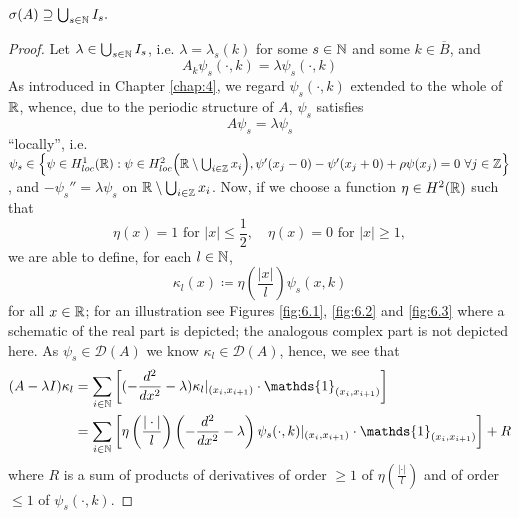 \begin{theorem} \label{4.1:thm-MainResult.FirstInclusion}
	$\sigma(A) \supseteq \bigcup_{s \in \mathbb{N}} I_{s}.$
	
	\begin{proof}
		Let $\lambda \in \bigcup_{s \in \mathbb{N}} I_{s}$, i.e. $\lambda = \lambda_{s}(k)$ for some $s \in \mathbb{N}$ and some $k \in \overline{B}$, and 
		\begin{equation}
			A_{k} \psi_{s}(\cdot, k) = \lambda \psi_{s}(\cdot, k) \label{firstinclusion-firstequation} 
		\end{equation} 
		As introduced in Chapter \ref{chap:4}, we regard $\psi_{s}(\cdot, k)$ extended to the whole of $\mathbb{R}$, whence, due to the periodic structure of $A$, $\psi_{s}$ satisfies
		\[ A \psi_{s} = \lambda \psi_{s} \]
		\enquote{locally}, i.e. $\psi_{s} \in \Big\{ \psi \in  H^{1}_{loc}(\mathbb{R}) : \psi \in H^{2}_{loc}\Big(\mathbb{R} \setminus \bigcup_{i \in \mathbb{Z}} x_{i} \Big), \psi'(x_{j} - 0) - \psi'(x_{j} + 0) + \rho  \psi(x_{j}) = 0 ~\forall j \in \mathbb{Z} \Big\}$, and $ -\psi_{s}'' = \lambda \psi_{s}$ on $\mathbb{R} \setminus \bigcup_{i \in \mathbb{Z}} x_{i}$. Now, if we choose a function $\eta \in H^{2}(\mathbb{R})$ such that 
			\begin{equation}
				\eta(x) = 1 \text{ for } |x| \leq \frac{1}{2}, \quad \eta(x) = 0 \text{ for } |x| \geq 1, \label{eta}
			\end{equation} 
		we are able to define, for each $l \in \mathbb{N}$,
			\[ \kappa_{l}(x) \coloneqq \eta\left(\frac{|x|}{l}\right) \psi_{s}(x, k) \]		
	 	for all $x \in \mathbb{R}$; for an illustration see Figures \ref{fig:6.1}, \ref{fig:6.2} and \ref{fig:6.3} where a schematic of the real part is depicted; the analogous complex part is not depicted here. As $\psi_{s} \in \mathcal{D}(A)$ we know $\kappa_{l} \in \mathcal{D}(A)$, hence, we see that
		\begin{align}
			(A - \lambda I) \kappa_{l} & = \sum_{i \in \N} \left[ (- \frac{d^{2}}{dx^{2}} - \lambda) \kappa_{l}|_{(x_{i}, x_{i+1})} \cdot \mathds{1}_{(x_{i}, x_{i+1})} \right] \label{eq:sepofspectraleq} \\
				& = \sum_{i \in \N} \left[ \eta\left(\frac{|\cdot|}{l}\right) \left(- \frac{d^{2}}{dx^{2}} - \lambda \right) \psi_{s}(\cdot, k) |_{(x_{i}, x_{i+1})} \cdot \mathds{1}_{(x_{i}, x_{i+1})} \right] + R \notag
		\end{align}
		where $R$ is a sum of products of derivatives of order $\geq 1$ of $\eta\left(\frac{|\cdot|}{l}\right)$ and of order $\leq 1$ of $\psi_{s}(\cdot, k)$. 
		

\end{proof}
\end{theorem}
